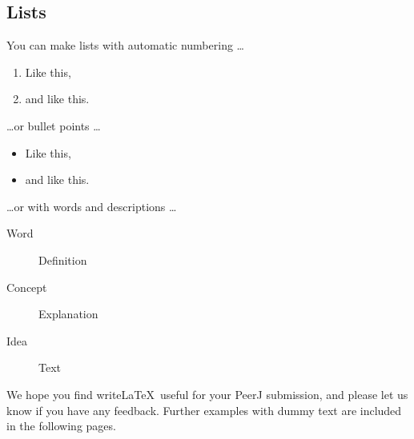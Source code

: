 \documentclass[fleqn,10pt,lineno]{wlpeerj} %
\begin{document}
\subsection*{Lists}

You can make lists with automatic numbering \dots

\begin{enumerate}[noitemsep]
\item Like this,
\item and like this.
\end{enumerate}
\dots or bullet points \dots
\begin{itemize}[noitemsep]
\item Like this,
\item and like this.
\end{itemize}
\dots or with words and descriptions \dots
\begin{description}
\item[Word] Definition
\item[Concept] Explanation
\item[Idea] Text
\end{description}

We hope you find write\LaTeX\ useful for your PeerJ submission, and please let us know if you have any feedback. Further examples with dummy text are included in the following pages.




\end{document}
